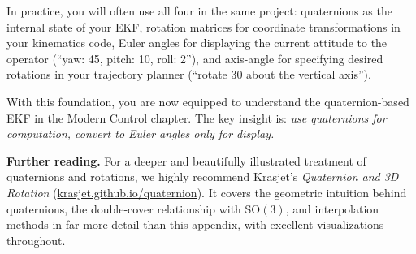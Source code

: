 In practice, you will often use all four in the same project: quaternions as the internal state of your EKF, rotation matrices for coordinate transformations in your kinematics code, Euler angles for displaying the current attitude to the operator (``yaw: 45\textdegree, pitch: 10\textdegree, roll: 2\textdegree''), and axis-angle for specifying desired rotations in your trajectory planner (``rotate 30\textdegree{} about the vertical axis'').

With this foundation, you are now equipped to understand the quaternion-based EKF in the Modern Control chapter. The key insight is: \textit{use quaternions for computation, convert to Euler angles only for display.}

\textbf{Further reading.} For a deeper and beautifully illustrated treatment of quaternions and rotations, we highly recommend Krasjet's \textit{Quaternion and 3D Rotation} (\href{https://krasjet.github.io/quaternion/quaternion.pdf}{krasjet.github.io/quaternion}). It covers the geometric intuition behind quaternions, the double-cover relationship with $\mathrm{SO}(3)$, and interpolation methods in far more detail than this appendix, with excellent visualizations throughout.
